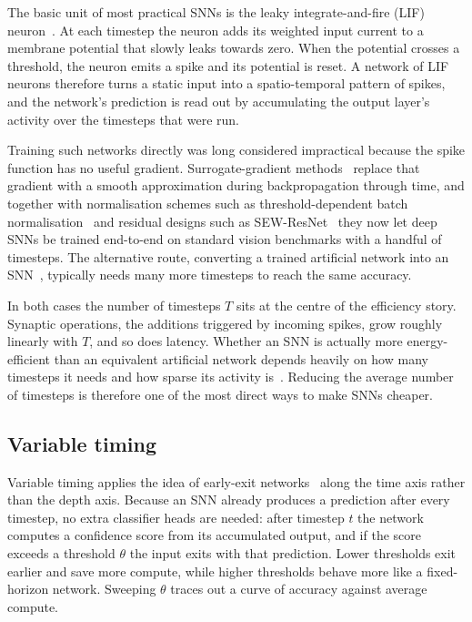 The basic unit of most practical SNNs is the leaky integrate-and-fire (LIF) neuron~\cite{gerstner2014neuronal}. At each timestep the neuron adds its weighted input current to a membrane potential that slowly leaks towards zero. When the potential crosses a threshold, the neuron emits a spike and its potential is reset. A network of LIF neurons therefore turns a static input into a spatio-temporal pattern of spikes, and the network's prediction is read out by accumulating the output layer's activity over the timesteps that were run.

Training such networks directly was long considered impractical because the spike function has no useful gradient. Surrogate-gradient methods~\cite{neftci2019surrogate, wu2018spatio} replace that gradient with a smooth approximation during backpropagation through time, and together with normalisation schemes such as threshold-dependent batch normalisation~\cite{zheng2021going} and residual designs such as SEW-ResNet~\cite{fang2021deep} they now let deep SNNs be trained end-to-end on standard vision benchmarks with a handful of timesteps. The alternative route, converting a trained artificial network into an SNN~\cite{rueckauer2017conversion}, typically needs many more timesteps to reach the same accuracy.

In both cases the number of timesteps $T$ sits at the centre of the efficiency story. Synaptic operations, the additions triggered by incoming spikes, grow roughly linearly with $T$, and so does latency. Whether an SNN is actually more energy-efficient than an equivalent artificial network depends heavily on how many timesteps it needs and how sparse its activity is~\cite{dampfhoffer2023snns, sorbaro2020optimizing}. Reducing the average number of timesteps is therefore one of the most direct ways to make SNNs cheaper.

\subsection{Variable timing}

Variable timing applies the idea of early-exit networks~\cite{teerapittayanon2016branchynet, huang2018multi, kaya2019shallow, laskaridis2021adaptive} along the time axis rather than the depth axis. Because an SNN already produces a prediction after every timestep, no extra classifier heads are needed: after timestep $t$ the network computes a confidence score from its accumulated output, and if the score exceeds a threshold $\theta$ the input exits with that prediction. Lower thresholds exit earlier and save more compute, while higher thresholds behave more like a fixed-horizon network. Sweeping $\theta$ traces out a curve of accuracy against average compute.

